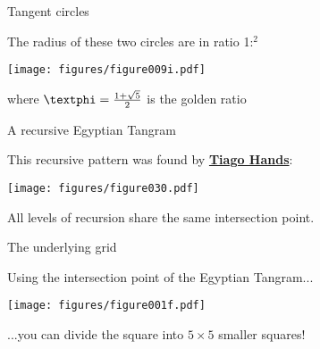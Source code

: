 \documentclass[14pt]{beamer}
\begin{document}

    \begin{frame}{Tangent circles}
        \begin{center}
            The radius of these two circles are in ratio 1:\textphi$^2$
        \end{center}\medskip
        \hspace{6.18em} \texttt{[image: figures/figure009i.pdf]} \\
        \begin{center}
             where $\text{\textphi} =\tfrac{1+\sqrt{5}}{2}$ is the golden ratio
        \end{center}
    \end{frame}


    \begin{frame}{A recursive Egyptian Tangram}
        \begin{center}
            This recursive pattern was found by \textbf{\href{https://twitter.com/tiago_hands/status/1671491322576863235}{Tiago Hands}}:
        \end{center}
        \hspace{6.18em} \texttt{[image: figures/figure030.pdf]} \\
        \begin{center}
             All levels of recursion share the same intersection point.
        \end{center}
    \end{frame}


    \begin{frame}{The underlying grid}
        \begin{center}
            Using the intersection point of the Egyptian Tangram...
        \end{center}
        \hspace{6.18em} \texttt{[image: figures/figure001f.pdf]} \\
        \begin{center}
             ...you can divide the square into $5\!\times\!5$ smaller squares!
        \end{center}
    \end{frame}
\end{document}

